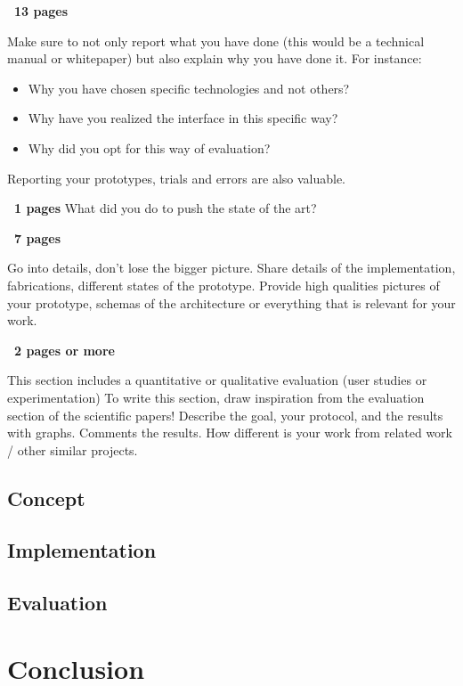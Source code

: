 \textbf{~13 pages}

Make sure to not only report what you have done (this would be a technical manual or whitepaper) but also explain why you have done it. For instance:

\begin{itemize}
    \item Why you have chosen specific technologies and not others?
    \item Why have you realized the interface in this specific way?
    \item Why did you opt for this way of evaluation?
\end{itemize}

Reporting your prototypes, trials and errors are also valuable.

\textbf{~1 pages}
What did you do to push the state of the art?

\textbf{~7 pages}

Go into details, don't lose the bigger picture. Share details of the implementation, fabrications, different states of the prototype. Provide high qualities pictures of your prototype, schemas of the architecture or everything that is relevant for your work.

\textbf{~2 pages or more}

This section includes a quantitative or qualitative evaluation (user studies or experimentation)
To write this section, draw inspiration from the evaluation section of the scientific papers! Describe the goal, your protocol, and the results with graphs. Comments the results. How different is your work from related work / other similar projects.

\subsection{Concept}
\subsection{Implementation}
\subsection{Evaluation}

\section{Conclusion}

